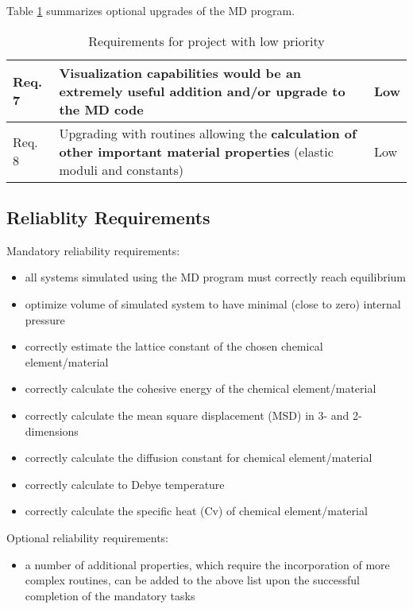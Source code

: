 \documentclass[12pt,a4paper]{article}
\begin{document}
Table \ref{tab:OptionalReq} summarizes optional upgrades of the MD program.

\begin{table}[h]
\caption{Requirements for project with low priority}
\begin{tabular}{| p{} | p{} | p{} |}
	\hline
	Req. 7 & \textbf{Visualization capabilities} would be an extremely useful addition and/or upgrade to the MD code & Low \\
	\hline
	Req. 8 & Upgrading with routines allowing the \textbf{calculation of other important material properties} (elastic moduli and constants) & Low \\
	\hline
\end{tabular}
\label{tab:OptionalReq}
\end{table}

\subsection{Reliablity Requirements}
Mandatory reliability requirements:
\begin{itemize}
\item all systems simulated using the MD program must correctly reach equilibrium
\item optimize volume of simulated system to have minimal (close to zero) internal pressure
\item correctly estimate the lattice constant of the chosen chemical element/material
\item correctly calculate the cohesive energy of the chemical element/material
\item correctly calculate the mean square displacement (MSD) in 3- and 2-dimensions
\item correctly calculate the diffusion constant for chemical element/material
\item correctly calculate to Debye temperature
\item correctly calculate the specific heat (Cv) of chemical element/material
\end{itemize}

Optional reliability requirements:
\begin{itemize}
\item a number of additional properties, which require the incorporation of more complex routines, can be added to the above list upon the successful completion of the mandatory tasks
\end{itemize}
\end{document}
